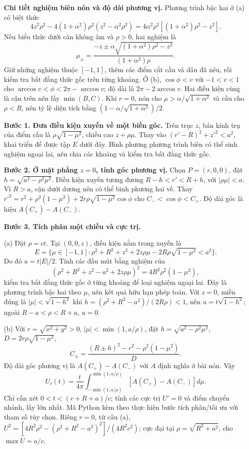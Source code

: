 \textbf{Chi tiết nghiệm biên nón và độ dài phương vị.} Phương trình bậc hai ở (a) có biệt thức
\[4z^2\rho^2-4(1+\alpha^2)\rho^2(z^2-\alpha^2\rho^2)
=4\alpha^2\rho^2[(1+\alpha^2)\rho^2-z^2].\]
Nếu biểu thức dưới căn không âm và $\rho>0$, hai nghiệm là
\[\mu_\pm=\frac{-z\pm\alpha\sqrt{(1+\alpha^2)\rho^2-z^2}}{(1+\alpha^2)\rho}.\]
Giữ những nghiệm thuộc $[-1,1]$, thêm các điểm cắt cầu và dấu đã nêu, rồi kiểm tra bất đẳng thức gốc trên từng khoảng. Ở (b), $\cos\phi<v$ với $-1<v<1$ cho $\arccos v<\phi<2\pi-\arccos v$; độ dài là $2\pi-2\arccos v$. Hai điều kiện cùng là cận trên nên lấy $\min(B,C)$. Khi $r=0$, nón cho $\mu>\alpha/\sqrt{1+\alpha^2}$ và cầu cho $\rho<R$, nên tỷ lệ diện tích bằng $(1-\alpha/\sqrt{1+\alpha^2})/2$.

\textbf{Bước 1. Đưa điều kiện xuyến về một biến góc.} Trên trục $z$, bán kính trụ của điểm cầu là $\rho\sqrt{1-\mu^2}$, chiều cao $z+\rho\mu$. Thay vào $(r'-R)^2+z'^2<a^2$, khai triển để được tập $E$ dưới đây. Bình phương phương trình biên có thể sinh nghiệm ngoại lai, nên chia các khoảng và kiểm tra bất đẳng thức gốc.

\textbf{Bước 2. Ở mặt phẳng $z=0$, tính góc phương vị.} Chọn $P=(r,0,0)$, đặt $h=\sqrt{a^2-\rho^2\mu^2}$. Điều kiện xuyến tương đương $R-h<r'<R+h$, với $|\rho\mu|<a$. Vì $R>a$, cận dưới dương nên có thể bình phương hai vế. Thay $r'^2=r^2+\rho^2(1-\mu^2)+2r\rho\sqrt{1-\mu^2}\cos\phi$ cho $C_-<\cos\phi<C_+$. Độ dài góc là hiệu $A(C_+)-A(C_-)$.

\textbf{Bước 3. Tích phân một chiều và cực trị.}

(a) Đặt $\rho=ct$. Tại $(0,0,z)$, điều kiện nằm trong xuyến là
\[E=\{\mu\in[-1,1]:\rho^2+R^2+z^2+2z\rho\mu-2R\rho\sqrt{1-\mu^2}<a^2\}.\]
Do đó $u=t|E|/2$. Tính các đầu mút bằng nghiệm của
\[(\rho^2+R^2+z^2-a^2+2z\rho\mu)^2=4R^2\rho^2(1-\mu^2),\]
kiểm tra bất đẳng thức gốc ở từng khoảng để loại nghiệm ngoại lai. Đây là phương trình bậc hai theo $\mu$, nên kết quả hữu hạn phép toán. Với $z=0$, miền đúng là $|\mu|<\sqrt{1-h^2}$ khi $h=(\rho^2+R^2-a^2)/(2R\rho)<1$, nên $u=t\sqrt{1-h^2}$; ngoài $R-a<\rho<R+a$, $u=0$.

(b) Với $r=\sqrt{x^2+y^2}>0$, $|\mu|<\min(1,a/\rho)$, đặt $h=\sqrt{a^2-\rho^2\mu^2}$, $D=2r\rho\sqrt{1-\mu^2}$,
\[C_\pm=\frac{(R\pm h)^2-r^2-\rho^2(1-\mu^2)}D.\]
Độ dài góc phương vị là $A(C_+)-A(C_-)$ với $A$ định nghĩa ở bài nón. Vậy
\[U_r(t)=\frac t{4\pi}\int_{-\min(1,a/\rho)}^{\min(1,a/\rho)}[A(C_+)-A(C_-)]d\mu.\]
Chỉ cần xét $0<t<(r+R+a)/c$; tính các cực trị $U'=0$ và điểm chuyển nhánh, lấy lớn nhất. Mã Python kèm theo thực hiện bước tích phân/tối ưu với tham số tùy chọn. Riêng $r=0$, từ câu (a), $U^2=[4R^2\rho^2-(\rho^2+R^2-a^2)^2]/(4R^2c^2)$; cực đại tại $\rho=\sqrt{R^2+a^2}$, cho $\max U=a/c$.

